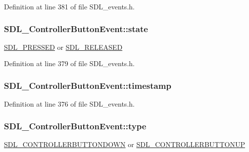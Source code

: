 Definition at line 381 of file S\-D\-L\-\_\-events.\-h.

\hypertarget{struct_s_d_l___controller_button_event_a00c46683f86674c2a4f74404ee3e857c}{
\subsubsection[{state}]{ S\-D\-L\-\_\-\-Controller\-Button\-Event\-::state}}\label{struct_s_d_l___controller_button_event_a00c46683f86674c2a4f74404ee3e857c}
\hyperlink{_s_d_l__events_8h_aee81bbffbc8489bdea8fecd1232c4bd1}{S\-D\-L\-\_\-\-P\-R\-E\-S\-S\-E\-D} or \hyperlink{_s_d_l__events_8h_ad680a069f9fcab80de91b3eefdf29c3c}{S\-D\-L\-\_\-\-R\-E\-L\-E\-A\-S\-E\-D} 

Definition at line 379 of file S\-D\-L\-\_\-events.\-h.

\hypertarget{struct_s_d_l___controller_button_event_a73003712734c4d2f966db3d7c2ce826b}{
\subsubsection[{timestamp}]{ S\-D\-L\-\_\-\-Controller\-Button\-Event\-::timestamp}}\label{struct_s_d_l___controller_button_event_a73003712734c4d2f966db3d7c2ce826b}


Definition at line 376 of file S\-D\-L\-\_\-events.\-h.

\hypertarget{struct_s_d_l___controller_button_event_a09869d792031e47a88673d85915c209f}{
\subsubsection[{type}]{ S\-D\-L\-\_\-\-Controller\-Button\-Event\-::type}}\label{struct_s_d_l___controller_button_event_a09869d792031e47a88673d85915c209f}
\hyperlink{_s_d_l__events_8h_a3b589e89be6b35c02e0dd34a55f3fccaaafe044d5f92ac9608ded473218569474}{S\-D\-L\-\_\-\-C\-O\-N\-T\-R\-O\-L\-L\-E\-R\-B\-U\-T\-T\-O\-N\-D\-O\-W\-N} or \hyperlink{_s_d_l__events_8h_a3b589e89be6b35c02e0dd34a55f3fccaa8cb5a10b1ae0e185ef69a321d3d2d1be}{S\-D\-L\-\_\-\-C\-O\-N\-T\-R\-O\-L\-L\-E\-R\-B\-U\-T\-T\-O\-N\-U\-P} 

